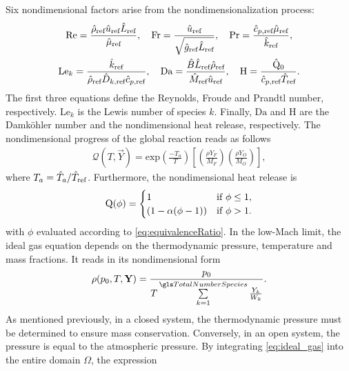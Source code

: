 Six nondimensional factors arise from the nondimensionalization process:
\begin{gather*}
	\text{Re} = \frac{\RefVal{\rho} \RefVal{u}  \RefVal{L}}{\RefVal{\Viscosity}}, \quad
	\text{Fr} = \frac{\RefVal{u}}{\sqrt{\RefVal{g}\RefVal{L}}}, \quad
	\text{Pr} = \frac{\RefValS{c}{p} \RefVal{\Viscosity}}{\RefVal{k}},\\%
	\text{Le}_k = \frac{\RefVal{k}}{\RefVal{\rho} \RefValS{D}{k} \RefValS{c}{p}}, \quad
	\Da = \frac{\hat B \RefVal{L} \RefVal{\rho}}{\RefVal{M}\RefVal{u}}, \quad \label{eq:Dahmkoeler}
	\text{H} = \frac{\hat \heatRelease_0}{\RefValS{c}{p} \RefVal{T}}.%
\end{gather*}
The first three equations define the Reynolds, Froude and Prandtl number, respectively. $\text{Le}_k$ is the Lewis number of species $k$. Finally, $\text{Da}$ and H are the Damköhler number and the nondimensional heat release, respectively. The nondimensional progress of the global reaction reads as follows
\begin{align}
	\mathcal{Q}(T, \vec{Y})  = \text{exp}\left(\frac{-T_a}{T}\right) \left[\left(\frac{\rho Y_F}{M_F}\right) \left(\frac{\rho Y_O}{M_O}\right)\right], \label{eq:NonDimArr}
\end{align}
where $T_a = \hat{T}_a / \hat T_{\text{ref}}$. Furthermore, the nondimensional heat release is
\begin{equation}
	\mathrm{Q}(\phi)=
	\begin{cases}
		1                     & \text{if}~ \phi \leq 1, \\
		(1 - \alpha(\phi -1)) & \text{if}~\phi > 1.
	\end{cases}  \label{eq:heatReleaseOneStepNonDim}
\end{equation}
with $\phi$ evaluated according to \cref{eq:equivalenceRatio}. In the low-Mach limit, the ideal gas equation depends on the thermodynamic pressure, temperature and mass fractions. It reads in its nondimensional form
\begin{align} \label{eq:ideal_gas}
	\rho(p_0,T, \vec{Y}) = \frac{p_0}{T \SumOvAllns \frac{Y_k}{W_k}}.
\end{align}
As mentioned previously, in a closed system, the thermodynamic pressure must be determined to ensure mass conservation. Conversely, in an open system, the pressure is equal to the atmospheric pressure. By integrating \cref{eq:ideal_gas} into the entire domain $\Omega$, the expression
